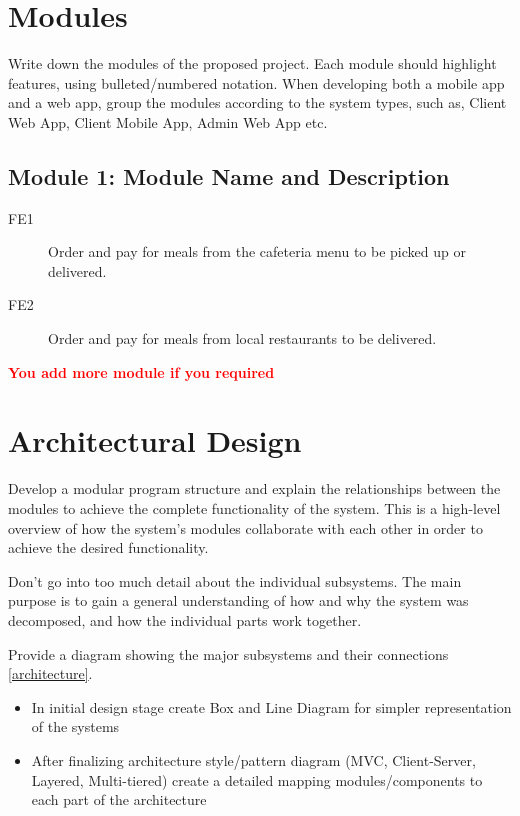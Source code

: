 \documentclass[A4paper,12pt]{report}
\theoremstyle{plain}
\theoremstyle{definition}
\theoremstyle{remark}
\numberwithin{equation}{section}
\begin{document}
\section{Modules}
Write down the modules of the proposed project.   
Each module should highlight features, using bulleted/numbered notation. 
When developing both a mobile app and a web app, group the modules according to the system types, such as, Client Web App, Client Mobile App, Admin Web App etc.


\subsection{Module 1:  Module Name and Description}
\begin{description}
\item[FE1] Order and pay for meals from the cafeteria menu to be picked up or delivered. 
	
	\item[FE2] Order and pay for meals from local restaurants to be delivered.
\end{description}


\textbf{\textcolor{red}{You add more module if you required}}




\section{Architectural Design}
Develop a modular program structure and explain the relationships between the modules to achieve the complete functionality of the system. This is a high-level overview of how the system’s modules collaborate with each other in order to achieve the desired functionality.

Don’t go into too much detail about the individual subsystems. The main purpose is to gain a general understanding of how and why the system was decomposed, and how the individual parts work together. 

Provide a diagram showing the major subsystems and their connections \ref{architecture}. 

\begin{itemize}
	\item In initial design stage create Box and Line Diagram for simpler representation of the systems
	\item After finalizing architecture style/pattern diagram (MVC, Client-Server, Layered, Multi-tiered) create a detailed mapping modules/components to each part of the architecture
\end{itemize}
\end{document}
